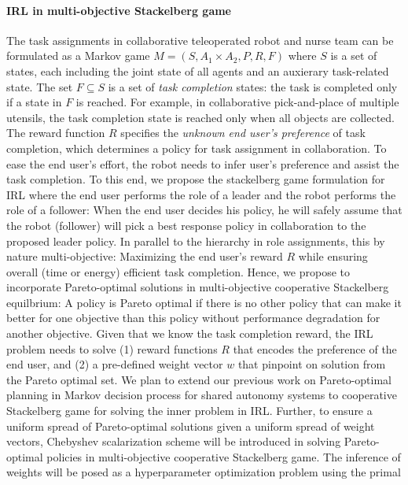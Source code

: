 \documentclass[letterpaper, 11 pt, onecolumn]{article}
\begin{document}
\paragraph*{IRL in multi-objective Stackelberg game}
The task assignments in collaborative teleoperated robot and
nurse team can be formulated as a Markov game $M=(S, A_1\times
A_2, P, R, F)$ where $S$ is a set of states, each including the joint
state of all agents and an auxierary task-related
state. The set $F\subseteq S$ is a set of \emph{task completion}
states: the task is completed only if a state in $F$ is reached. For
example, in collaborative pick-and-place of multiple utensils,
the task completion state is reached only when all objects are
collected.  The reward function $R$ specifies the \emph{unknown
end user's preference} of task completion, which determines a
policy for task assignment in collaboration. To ease the end
user's effort, the robot needs to infer user's preference and
assist the task completion. To this end, we propose the
stackelberg game formulation for IRL where the end user performs
the role of a leader and the robot performs the role of a
follower: When the end user decides his policy, he will safely
assume that the robot (follower) will pick a best response policy
in collaboration to the proposed leader policy. In parallel to the hierarchy in role assignments, this  by nature multi-objective: Maximizing the
end user's reward $R$ while ensuring overall (time or energy)
efficient task completion. Hence, we propose to incorporate
Pareto-optimal solutions in multi-objective cooperative
Stackelberg equilbrium: A policy is Pareto optimal if there is no
other policy that can make it better for one objective than this
policy without performance degradation for another objective.  Given that we know
the task completion reward, the IRL problem needs to solve (1)
reward functions $R$ that encodes the preference of the end user,
and (2) a pre-defined weight vector $w$ that pinpoint on solution
from the Pareto optimal set. We plan to extend our previous work on Pareto-optimal planning in Markov decision process for shared autonomy systems \cite{fu2016synthesis} to cooperative Stackelberg game for solving the inner problem in IRL. Further, to ensure a uniform spread of Pareto-optimal solutions given a uniform spread of weight vectors,  Chebyshev
scalarization scheme \cite{perny2010finding} will be introduced in solving  Pareto-optimal policies in multi-objective
cooperative Stackelberg game. The inference of weights will be posed as a hyperparameter optimization problem using the primal
\end{document}
